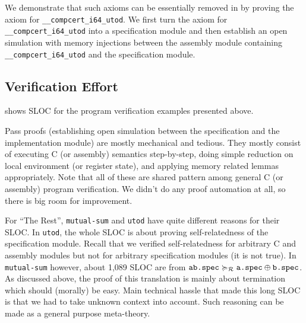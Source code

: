We demonstrate that such axioms can be essentially removed in \ccm{} by proving the axiom for \verb|__compcert_i64_utod|.
We first turn the axiom for \verb|__compcert_i64_utod| into a specification module
and then establish an open simulation with memory injections between the assembly module containing \verb|__compcert_i64_utod| and the specification module.

\subsection{Verification Effort}
\label{sec:program:solution:evaluation}

 shows SLOC for the program verification examples presented above.

Pass proofs (establishing open simulation between the specification and the implementation module) are mostly mechanical and tedious.
They mostly consist of executing C (or assembly) semantics step-by-step, doing simple reduction on local environment (or register state), and applying memory related lemmas appropriately.
Note that all of these are shared pattern among general C (or assembly) program verification.
We didn't do any proof automation at all, so there is big room for improvement.

For ``The Rest'', \texttt{mutual-sum} and \texttt{utod} have quite different reasons for their SLOC.
In \texttt{utod}, the whole SLOC is about proving self-relatedness of the specification module.
Recall that we verified self-relatedness for arbitrary C and assembly modules but not for arbitrary specification modules (it is not true).
In \texttt{mutual-sum} however, about 1,089 SLOC are from $\texttt{ab.spec} \succcurlyeq_{\mathcal{R}} \texttt{a.spec} \oplus \texttt{b.spec}$.
As discussed above, the proof of this translation is mainly about termination which should (morally) be easy.
Main technical hassle that made this long SLOC is that we had to take unknown context into account.
Such reasoning can be made as a general purpose meta-theory.





